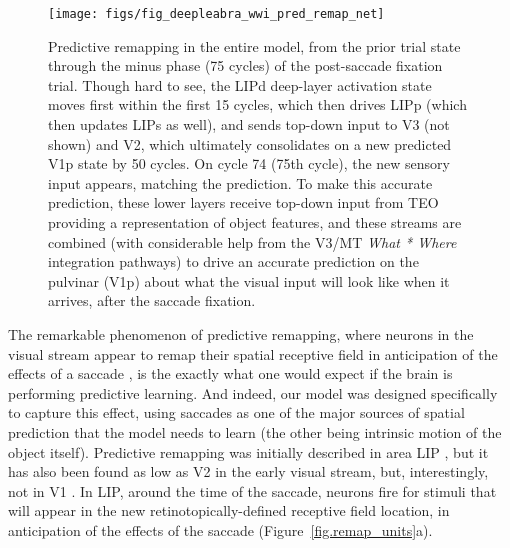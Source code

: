 \documentclass[11pt,twoside]{article}
\newif\myifpdf
\begin{document}
\begin{figure}
  \centering\texttt{[image: figs/fig\_deepleabra\_wwi\_pred\_remap\_net]}
  \caption{\footnotesize Predictive remapping in the entire model, from the prior trial state through the minus phase (75 cycles) of the post-saccade fixation trial.  Though hard to see, the LIPd deep-layer activation state moves first within the first 15 cycles, which then drives LIPp (which then updates LIPs as well), and sends top-down input to V3 (not shown) and V2, which ultimately consolidates on a new predicted V1p state by 50 cycles.  On cycle 74 (75th cycle), the new sensory input appears, matching the prediction.  To make this accurate prediction, these lower layers receive top-down input from TEO providing a representation of object features, and these streams are combined (with considerable help from the V3/MT {\em What * Where} integration pathways) to drive an accurate prediction on the pulvinar (V1p) about what the visual input will look like when it arrives, after the saccade fixation.}
  \label{fig.remap_net}
\end{figure}

The remarkable phenomenon of predictive remapping, where neurons in the visual stream appear to remap their spatial receptive field in anticipation of the effects of a saccade \cite{DuhamelColbyGoldberg92,ColbyDuhamelGoldberg97,GottliebKusunokiGoldberg98,NakamuraColby02,NeupaneGuittonPack16}, is the exactly what one would expect if the brain is performing predictive learning.  And indeed, our model was designed specifically to capture this effect, using saccades as one of the major sources of spatial prediction that the model needs to learn (the other being intrinsic motion of the object itself).  Predictive remapping was initially described in area LIP \cite{DuhamelColbyGoldberg92}, but it has also been found as low as V2 in the early visual stream, but, interestingly, not in V1 \cite{NakamuraColby02}.  In LIP, around the time of the saccade, neurons fire for stimuli that will appear in the new retinotopically-defined receptive field location, in anticipation of the effects of the saccade (Figure~\ref{fig.remap_units}a).
\end{document}
